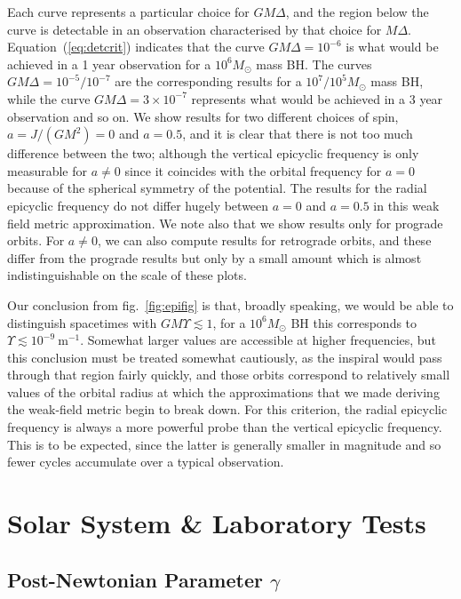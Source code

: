 \documentclass[aps,prd,amsfonts,amssymb,amsmath,nofootinbib,reprint,showpacs]{revtex4-1}
\newcommand{\eqnref}[1]{(\ref{eq:#1})}
\newcommand{\figref}[1]{fig.\ \ref{fig:#1}}
\newcommand{\units}[1]{\ensuremath{~\mathrm{#1}}}
\begin{document}
Each curve represents a particular choice for $GM\Delta$, and the region below the curve is detectable in an observation characterised by that choice for $M\Delta$. Equation~\eqnref{detcrit} indicates that the curve $GM\Delta = 10^{-6}$ is what would be achieved in a 1 year observation for a $10^6M_\odot$ mass BH. The curves $GM\Delta = 10^{-5}/10^{-7}$ are the corresponding results for a $10^7/10^5M_\odot$ mass BH, while the curve $GM\Delta = 3\times10^{-7}$ represents what would be achieved in a 3 year observation and so on. We show results for two different choices of spin, $a = J/(GM^2) = 0$ and $a=0.5$, and it is clear that there is not too much difference between the two; although the vertical epicyclic frequency is only measurable for $a \neq 0$ since it coincides with the orbital frequency for $a=0$ because of the spherical symmetry of the potential. The results for the radial epicyclic frequency do not differ hugely between $a=0$ and $a=0.5$ in this weak field metric approximation. We note also that we show results only for prograde orbits. For $a \neq 0$, we can also compute results for retrograde orbits, and these differ from the prograde results but only by a small amount which is almost indistinguishable on the scale of these plots.

Our conclusion from \figref{epifig} is that, broadly speaking, we would be able to distinguish spacetimes with $GM\Upsilon \lesssim 1 $, for a $10^6 M_\odot$ BH this corresponds to $\Upsilon \lesssim 10^{-9}\units{m^{-1}}$. Somewhat larger values are accessible at higher frequencies, but this conclusion must be treated somewhat cautiously, as the inspiral would pass through that region fairly quickly, and those orbits correspond to relatively small values of the orbital radius at which the approximations that we made deriving the weak-field metric begin to break down. For this criterion, the radial epicyclic frequency is always a more powerful probe than the vertical epicyclic frequency. This is to be expected, since the latter is generally smaller in magnitude and so fewer cycles accumulate over a typical observation.

\section{Solar System \& Laboratory Tests\label{sec:Tests}}

\subsection{Post-Newtonian Parameter $\gamma$}
\end{document}
